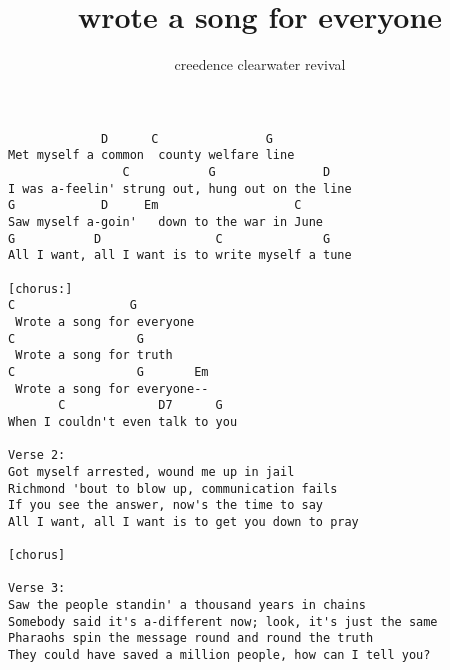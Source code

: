 \author{creedence clearwater revival}
\title{wrote a song for everyone}
\maketitle
\begin{verbatim}
             D      C               G
Met myself a common  county welfare line
                C           G               D
I was a-feelin' strung out, hung out on the line
G            D     Em                   C
Saw myself a-goin'   down to the war in June
G           D                C              G
All I want, all I want is to write myself a tune

[chorus:]
C                G
 Wrote a song for everyone
C                 G
 Wrote a song for truth
C                 G       Em
 Wrote a song for everyone--
       C             D7      G
When I couldn't even talk to you

Verse 2:
Got myself arrested, wound me up in jail
Richmond 'bout to blow up, communication fails
If you see the answer, now's the time to say
All I want, all I want is to get you down to pray

[chorus]

Verse 3:
Saw the people standin' a thousand years in chains
Somebody said it's a-different now; look, it's just the same
Pharaohs spin the message round and round the truth
They could have saved a million people, how can I tell you?
\end{verbatim}